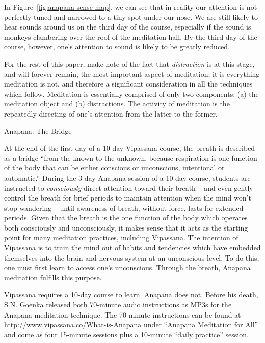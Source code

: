 \documentclass{article}
\begin{document}
In Figure~\ref{fig:anapana-sense-map}, we can see that in reality our attention is not perfectly tuned and narrowed to a tiny spot under our nose. We are still likely to hear sounds around us on the third day of the course, especially if the sound is monkeys clambering over the roof of the meditation hall. By the third day of the course, however, one's attention to sound is likely to be greatly reduced.

For the rest of this paper, make note of the fact that \textit{distraction} is at this stage, and will forever remain, the most important aspect of meditation; it is everything meditation is not, and therefore a significant consideration in all the techniques which follow. Meditation is essentially comprised of only two components: (a) the meditation object and (b) distractions. The activity of meditation is the repeatedly directing of one's attention from the latter to the former.

\pagebreak

\begin{center}
  \LARGE{Anapana: The Bridge}
\end{center}

At the end of the first day of a 10-day Vipassana course, the breath is described as a bridge ``from the known to the unknown, because respiration is one function of the body that can be either conscious or unconscious, intentional or automatic.'' During the 3-day Anapana session of a 10-day course, students are instructed to \textit{consciously} direct attention toward their breath -- and even gently control the breath for brief periods to maintain attention when the mind won't stop wandering -- until awareness of breath, without force, lasts for extended periods. Given that the breath is the one function of the body which operates both consciously and unconsciously, it makes sense that it acts as the starting point for many meditation practices, including Vipassana. The intention of Vipassana is to train the mind out of habits and tendencies which have embedded themselves into the brain and nervous system at an unconscious level. To do this, one must first learn to access one's unconscious. Through the breath, Anapana meditation fulfills this purpose.

Vipassana requires a 10-day course to learn. Anapana does not. Before his death, S.N. Goenka released both 70-minute audio instructions as MP3s for the Anapana meditation technique.\cite{anapana} The 70-minute instructions can be found at \url{http://www.vipassana.co/What-is-Anapana} under ``Anapana Meditation for All'' and come as four 15-minute sessions plus a 10-minute ``daily practice'' session.
\end{document}
